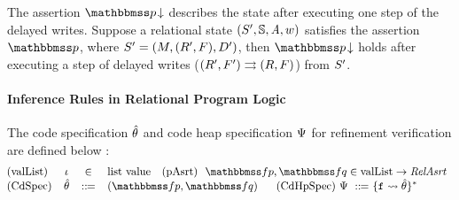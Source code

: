 The assertion $\nxtAst{\relastP}$ describes the
state after executing one step of the delayed writes.
Suppose a relational state
$(S', \mathbb{S}, \textit{A}, w)$ satisfies the
assertion $\relastP$, where $S' = (M, (R', F), D')$,
then $\nxtAst{\relastP}$ holds after executing a step
of delayed writes (${(R', F')}\rightrightarrows{(R, F)}$)
from $S'$.

\paragraph{Inference Rules in Relational Program Logic}
The code specification $\hat{\theta}$ and code heap specification
$\Psi$ for refinement verification are defined below :
\[
    \small
    \!\!\!\!
    \begin{array}{lccl}
        \TYPE{(valList)} &
        \lgvl & \in & \TYPE{list} \ \TYPE{value}
        \ \ \
        \TYPE{(pAsrt)} \ \
        \relspecpre, \relspecpost \in
        \TYPE{valList} \rightarrow \textit{RelAsrt} \\
        \TYPE{(CdSpec)} & \RelBspec & \define &
        (\relspecpre, \relspecpost) \quad \ \
        \TYPE{(CdHpSpec)} \ \Cspec \ \define \
        \{ \lab{} \rightsquigarrow \RelBspec \}^{*}
    \end{array}
\]
			
				
